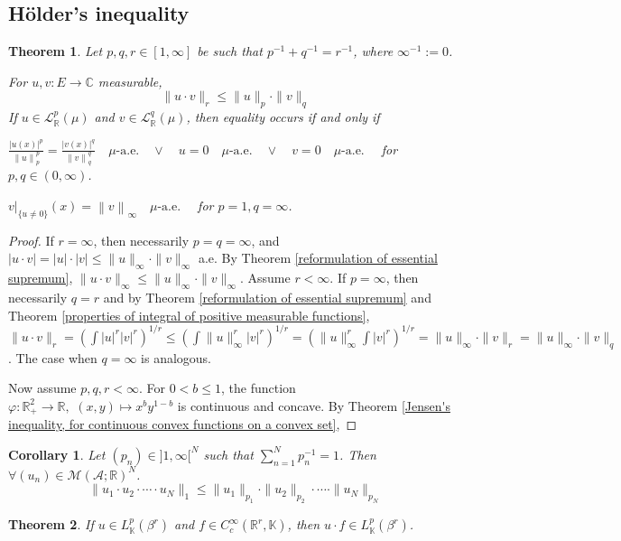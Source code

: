 \documentclass[11pt, a4paper, openany]{book}
\newtheorem{thm}{Theorem}\newtheorem{lem}{Lemma}\newtheorem{crl}{Corollary}
\theoremstyle{definition}
\newenvironment{tight_enumerate}{\begin{enumerate}\itemsep -0.2em}{\end{enumerate}}
\begin{document}
\subsection{H\"{o}lder's inequality}
        \begin{thm}
            Let $p,q,r\in [1,\infty]$ be such that $p^{-1}+q^{-1}=r^{-1}$, where $\infty^{-1}:=0$. 
            
            For $u,v:E\rightarrow\mathbb{C}$ measurable, 
            \[\|u\cdot v\|_r\leqslant \|u\|_p\cdot \|v\|_q\]
            If $u\in\mathcal{L}_{\mathbb{R}}^p(\mu)$ and $v\in\mathcal{L}_{\mathbb{R}}^q(\mu)$, then equality occurs if and only if
        \begin{tight_enumerate}
            \item $\displaystyle \frac{|u(x)|^p}{\left\|u\right\|_p^p}=\frac{|v(x)|^q}{\left\|v\right\|_q^q}\quad \mu\text{-a.e.}\quad\vee\quad u=0\quad \mu\text{-a.e.}\quad\vee\quad v=0\quad \mu\text{-a.e.}\quad$ for $p,q\in(0,\infty)$.
            \item $v|_{\{u\neq 0\}}(x)=\left\|v\right\|_\infty\quad \mu\text{-a.e.}\quad$ for $p=1,q=\infty$.
        \end{tight_enumerate}
        \end{thm}
        \begin{proof}
            If $r=\infty$, then necessarily $p=q=\infty$, and $|u\cdot v|=|u|\cdot |v|\leqslant \|u\|_\infty\cdot \|v\|_\infty$ a.e. By Theorem \ref{reformulation of essential supremum}, $\|u\cdot v\|_\infty\leqslant \|u\|_\infty\cdot \|v\|_\infty$. Assume $r<\infty$. If $p=\infty$, then necessarily $q=r$ and by Theorem \ref{reformulation of essential supremum} and Theorem \ref{properties of integral of positive measurable functions}, $\|u\cdot v\|_r=(\int |u|^r|v|^r)^{1/r}\leqslant (\int \|u\|_\infty^r|v|^r)^{1/r}=(\|u\|_\infty^r\int |v|^r)^{1/r}=\|u\|_\infty\cdot \|v\|_r=\|u\|_\infty\cdot \|v\|_q$. The case when $q=\infty$ is analogous. 
            
            Now assume $p,q,r<\infty$. For $0<b\leqslant 1$, the function $\varphi:\mathbb{R}_+^2\rightarrow\mathbb{R},\,\, (x,y)\mapsto x^by^{1-b}$ is continuous and concave. By Theorem \ref{Jensen's inequality, for continuous convex functions on a convex set},
        \end{proof}
        \begin{crl}
            Let $(p_n)\in ]1,\infty[^N$ such that $\sum_{n=1}^Np_n^{-1}=1$. Then $\forall (u_n)\in\mathcal{M}(\mathscr{A};\mathbb{R})^N$. 
            \[\|u_1\cdot u_2\cdot\cdots\cdot u_N\|_1\leqslant \|u_1\|_{p_1}\cdot \|u_2\|_{p_2}\cdot\cdots\cdot \|u_N\|_{p_N}\]
        \end{crl}
        \begin{thm}
            If $u\in L^p_\mathbb{K}(\beta^r)$ and $f\in C^\infty_c(\mathbb{R}^r,\mathbb{K})$, then $u\cdot f\in L^p_\mathbb{K}(\beta^r)$.
        \end{thm}
\end{document}
